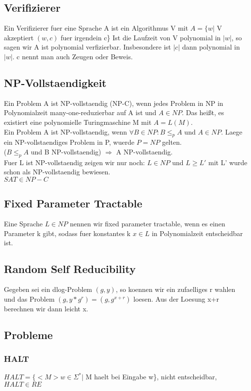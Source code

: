 \documentclass[a4paper]{scrreprt}
\begin{document}
\subsection{Verifizierer}
Ein Verifizierer fuer eine Sprache A ist ein Algorithmus V mit $A = \{w|$ V akzeptiert $(w,c)$ fuer irgendein c\}
Ist die Laufzeit von V polynomial in $|w|$, so sagen wir A ist polynomial verfizierbar. Insbesondere ist $|c|$ dann polynomial in $|w|$. c nennt man auch Zeugen oder Beweis.

\subsection{NP-Vollstaendigkeit}
Ein Problem A ist NP-vollstaendig (NP-C), wenn jedes Problem in NP in Polynomialzeit many-one-reduzierbar auf A ist und $A \in NP$.
Das heißt, es existiert eine polynomielle Turingmaschine M mit $A = L(M)$.\\
Ein Problem A ist NP-vollstaendig, wenn $\forall B \in NP: B \le_p A$ und $A \in NP$.
Laege ein NP-vollstaendiges Problem in P, wuerde $P = NP$ gelten.\\
($B \le_p A$ und B NP-vollstaendig) $\Rightarrow$ A NP-vollstaendig.\\
Fuer L ist NP-vollstaendig zeigen wir nur noch: $L \in NP$ und $L \ge L'$ mit L' wurde schon als NP-vollstaendig bewiesen.\\
$SAT \in NP-C$\\

\subsection{Fixed Parameter Tractable}
Eine Sprache $L \in NP$ nennen wir fixed parameter tractable, wenn es einen Parameter k gibt, sodass fuer konstantes k $x \in L$ in Polynomialzeit entscheidbar ist.

\subsection{Random Self Reducibility}
Gegeben sei ein dlog-Problem $(g, y)$, so koennen wir ein zufaelliges r wahlen und das Problem $(g, y*g^r) = (g, g^{x+r})$ loesen. Aus der Loesung x+r berechnen wir dann leicht x.




\subsection{Probleme}
\subsubsection{HALT} $HALT = \{<M> w \in \Sigma^*|$ M haelt bei Eingabe w\}, nicht entscheidbar, $HALT \in RE$
\end{document}
